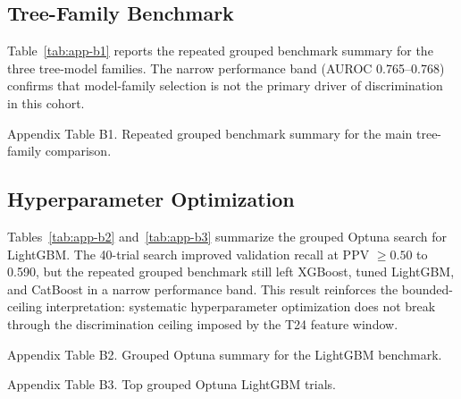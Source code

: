 \begin{appendices}
\subsection{Tree-Family Benchmark}

Table~\ref{tab:app-b1} reports the repeated grouped benchmark summary for the three tree-model families. The narrow performance band (AUROC 0.765--0.768) confirms that model-family selection is not the primary driver of discrimination in this cohort.

\begin{table}[!t]
\centering
\small
\caption{Appendix Table B1. Repeated grouped benchmark summary for the main tree-family comparison.}
\label{tab:app-b1}
\begin{adjustbox}{max width=\linewidth}

\end{adjustbox}
\end{table}

\subsection{Hyperparameter Optimization}

Tables~\ref{tab:app-b2} and~\ref{tab:app-b3} summarize the grouped Optuna search for LightGBM. The 40-trial search improved validation recall at PPV $\geq 0.50$ to 0.590, but the repeated grouped benchmark still left XGBoost, tuned LightGBM, and CatBoost in a narrow performance band. This result reinforces the bounded-ceiling interpretation: systematic hyperparameter optimization does not break through the discrimination ceiling imposed by the T24 feature window.

\begin{table}[!t]
\centering
\small
\caption{Appendix Table B2. Grouped Optuna summary for the LightGBM benchmark.}
\label{tab:app-b2}
\begin{adjustbox}{max width=\textwidth}

\end{adjustbox}
\end{table}

\begin{table}[!t]
\centering
\scriptsize
\caption{Appendix Table B3. Top grouped Optuna LightGBM trials.}
\label{tab:app-b3}
\begin{adjustbox}{max width=\textwidth}

\end{adjustbox}
\end{table}


\end{appendices}
